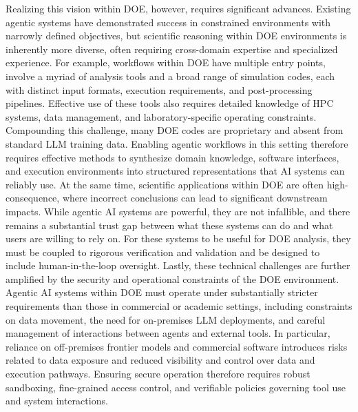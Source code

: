 \documentclass[11pt]{article} \usepackage[margin=1in]{geometry}
\begin{document}
Realizing this vision within DOE, however, requires significant advances.
Existing agentic systems have demonstrated success in constrained environments
with narrowly defined objectives, but scientific reasoning within DOE environments is inherently more diverse, often requiring cross-domain expertise and specialized experience. For example, workflows within DOE have multiple entry points, involve a myriad of analysis tools and a
broad range of simulation codes, each with distinct input formats, execution
requirements, and post-processing pipelines. Effective use of these tools also
requires detailed knowledge of HPC systems, data management, and
laboratory-specific operating constraints. Compounding this challenge, many DOE
codes are proprietary and absent from standard LLM training data. Enabling
agentic workflows in this setting therefore requires effective methods to synthesize
domain knowledge, software interfaces, and execution environments into
structured representations that AI systems can reliably use.
At the same time, scientific applications within DOE are often
high-consequence, where incorrect conclusions can lead to significant
downstream impacts. While agentic AI systems are powerful, they are not
infallible, and there remains a substantial trust gap between what these
systems can do and what users are willing to rely on. For these systems to be
useful for DOE analysis, they must be coupled to rigorous verification and validation 
and be designed to include human-in-the-loop oversight. Lastly, these technical challenges are further amplified by the security and operational
constraints of the DOE environment. Agentic AI systems within DOE must operate
under substantially stricter requirements than those in commercial or academic
settings, including constraints on data movement, the need for on-premises LLM deployments, and careful management of interactions between
agents and external tools. In particular, reliance on off-premises frontier
models and commercial software introduces risks related to data exposure and
reduced visibility and control over data and execution pathways. Ensuring
secure operation therefore requires robust sandboxing, fine-grained access
control, and verifiable policies governing tool use and system interactions.
\end{document}
